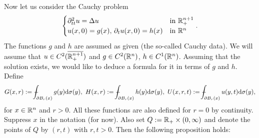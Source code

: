 \documentclass[11pt]{article}
\begin{document}
				Now let us consider the Cauchy problem
				\begin{equation*}
					\begin{cases}
						\partial_{tt}^2u=\Delta u & \text{in }\mathbb{R}^{n+1}_+\\
						u(x,0)=g(x),\,\partial_tu(x,0)=h(x) & \text{in }\mathbb{R}^n
					\end{cases}.
				\end{equation*}
				The functions $g$ and $h$ are assumed as given (the so-called Cauchy data). We will assume that $u\in C^2(\overline{\mathbb{R}^{n+1}_+})$ and $g\in C^2(\mathbb{R}^n)$, $h\in C^1(\mathbb{R}^n)$. Assuming that the solution exists, we would like to deduce a formula for it in terms of $g$ and $h$. Define 
				\begin{equation*}
					G(x,r):=\dashint_{\partial B_r(x)}g(y)\mathrm{d}\sigma(y),\,\, H(x,r):=\dashint_{\partial B_r(x)}h(y)\mathrm{d}\sigma(y),\,\, U(x,r,t):=\dashint_{\partial B_r(x)}u(y,t)\mathrm{d}\sigma(y),
				\end{equation*}
				for $x\in\mathbb{R}^n$ and $r>0$. All these functions are also defined for $r=0$ by continuity. Suppress $x$ in the notation (for now). Also set $Q:=\mathbb{R}_+\times(0,\infty)$ and denote the points of $Q$ by $(r,t)$ with $r,t>0$. Then the following proposition holds:
\end{document}
